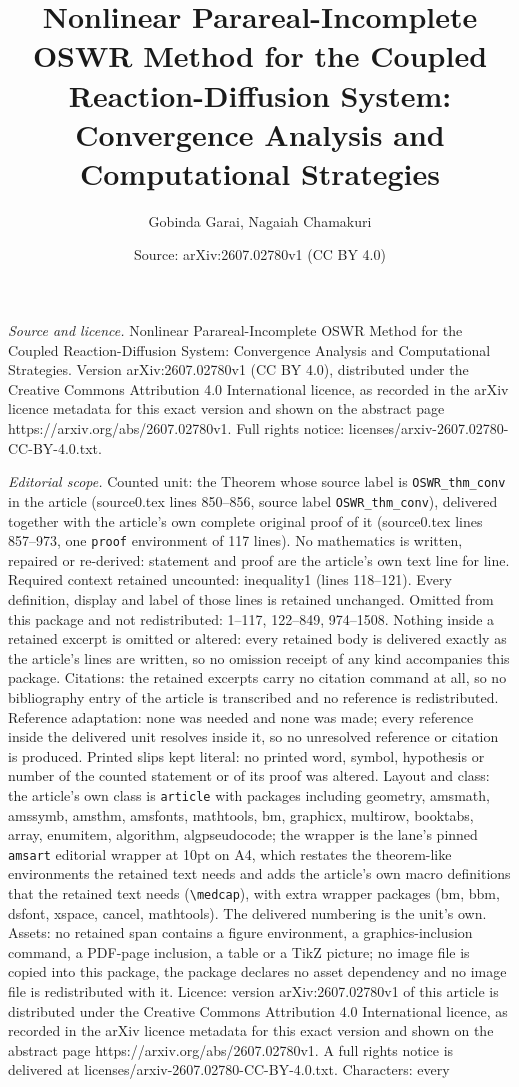 \documentclass[10pt,a4paper]{amsart}
\title[Nonlinear Parareal-Incomplete OSWR Method for the Coupled Re]{Nonlinear Parareal-Incomplete OSWR Method for the Coupled Reaction-Diffusion System: Convergence Analysis and Computational Strategies}
\author{Gobinda Garai, Nagaiah Chamakuri}
\date{Source: arXiv:2607.02780v1 (CC BY 4.0)}
\begin{document}
\maketitle

\noindent\emph{Source and licence.} Nonlinear Parareal-Incomplete OSWR Method for the Coupled Reaction-Diffusion System: Convergence Analysis and Computational Strategies. Version arXiv:2607.02780v1 (CC BY 4.0), distributed under the Creative Commons Attribution 4.0 International licence, as recorded in the arXiv licence metadata for this exact version and shown on the abstract page https://arxiv.org/abs/2607.02780v1. Full rights notice: licenses/arxiv-2607.02780-CC-BY-4.0.txt.\par\smallskip

\noindent\textit{Editorial scope.} Counted unit: the Theorem whose source label is \texttt{OSWR\_thm\_conv} in the article (source0.tex lines 850--856, source label \texttt{OSWR\_thm\_conv}), delivered together with the article's own complete original proof of it (source0.tex lines 857--973, one \texttt{proof} environment of 117 lines). No mathematics is written, repaired or re-derived: statement and proof are the article's own text line for line. Required context retained uncounted: inequality1 (lines 118--121). Every definition, display and label of those lines is retained unchanged. Omitted from this package and not redistributed: 1--117, 122--849, 974--1508. Nothing inside a retained excerpt is omitted or altered: every retained body is delivered exactly as the article's lines are written, so no omission receipt of any kind accompanies this package. Citations: the retained excerpts carry no citation command at all, so no bibliography entry of the article is transcribed and no reference is redistributed. Reference adaptation: none was needed and none was made; every reference inside the delivered unit resolves inside it, so no unresolved reference or citation is produced. Printed slips kept literal: no printed word, symbol, hypothesis or number of the counted statement or of its proof was altered. Layout and class: the article's own class is \texttt{article} with packages including geometry, amsmath, amssymb, amsthm, amsfonts, mathtools, bm, graphicx, multirow, booktabs, array, enumitem, algorithm, algpseudocode; the wrapper is the lane's pinned \texttt{amsart} editorial wrapper at 10pt on A4, which restates the theorem-like environments the retained text needs and adds the article's own macro definitions that the retained text needs (\texttt{\textbackslash medcap}), with extra wrapper packages (bm, bbm, dsfont, xspace, cancel, mathtools). The delivered numbering is the unit's own. Assets: no retained span contains a figure environment, a graphics-inclusion command, a PDF-page inclusion, a table or a TikZ picture; no image file is copied into this package, the package declares no asset dependency and no image file is redistributed with it. Licence: version arXiv:2607.02780v1 of this article is distributed under the Creative Commons Attribution 4.0 International licence, as recorded in the arXiv licence metadata for this exact version and shown on the abstract page https://arxiv.org/abs/2607.02780v1. A full rights notice is delivered at licenses/arxiv-2607.02780-CC-BY-4.0.txt. Characters: every 
\end{document}
